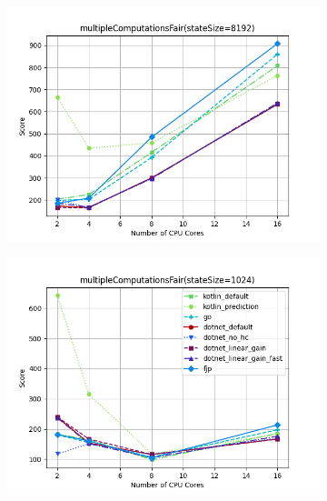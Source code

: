 \documentclass{article}
\begin{document}
\begin{figure}[H]
    \begin{subfigure}[b]{0.48\textwidth}
        \includegraphics[width=\linewidth]{plots/multipleComputationsFair(stateSize=8192).png}
    \end{subfigure}
    \begin{subfigure}[b]{0.48\textwidth}
        \includegraphics[width=\linewidth]{plots/multipleComputationsFair(stateSize=1024)_with_legend.png}
    \end{subfigure}
\end{figure}
\end{document}

